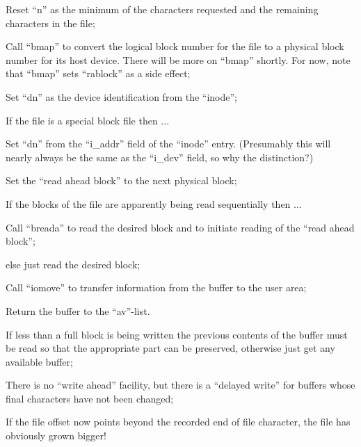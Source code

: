 \item[6246:] Reset ``n'' as the minimum of the
 characters requested and the
 remaining characters in the file;

\item[6248:] Call ``bmap'' to convert the logical block number for the file to
 a physical block number for its
 host device. There will be more
 on ``bmap'' shortly. For now, note
 that ``bmap'' sets ``rablock'' as a
 side effect;

\item[6250:] Set ``dn'' as the device identification from the ``inode'';

\item[6251:] If the file is a special block
 file then ...

\item[6252:] Set ``dn'' from the ``i\_addr'' field
 of the ``inode'' entry. (Presumably
 this will nearly always be the
 same as the ``i\_dev'' field, so why
 the distinction?)

\item[6253:] Set the ``read ahead block'' to the
 next physical block;

\item[6255:] If the blocks of the file are
 apparently being read sequentially then ...

\item[6256:] Call ``breada'' to read the desired
 block and to initiate reading of
 the ``read ahead block'';

\item[6258:] else just read the desired block;

\item[6260:] Call ``iomove'' to transfer information from the buffer to the
 user area;

\item[6261:] Return the buffer to the
 ``av''-list.
\ed



\bd
\item[6303:] If less than a full block is
 being written the previous contents of the buffer must be read
 so that the appropriate part can
 be preserved, otherwise just get
 any available buffer;

\item[6311:] There is no ``write ahead'' facility, but there is a ``delayed
 write'' for buffers whose final
 characters have not been changed;

\item[6312:] If the file offset now points
 beyond the recorded end of file
 character, the file has obviously
 grown bigger!

